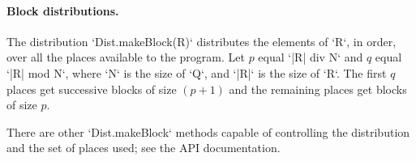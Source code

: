 \paragraph{Block distributions.}
The distribution \xcd`Dist.makeBlock(R)` distributes the elements of \xcd`R`,
in order, over all the places available to the program. 
Let $p$ equal \xcd`|R| div N` and $q$ equal \xcd`|R| mod N`,
where \xcd`N` is the size of \xcd`Q`, and 
\xcd`|R|` is the size of \xcd`R`.  The first $q$ places get
successive blocks of size $(p+1)$ and the remaining places get blocks of
size $p$.

There are other \xcd`Dist.makeBlock` methods capable of controlling the
distribution and the set of places used; see the API documentation.


